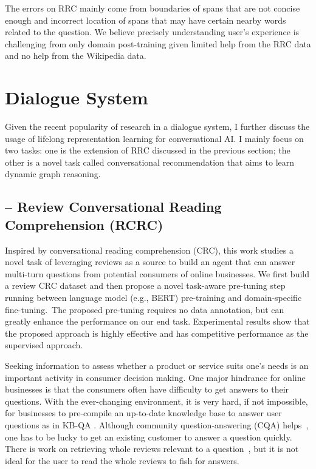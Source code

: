 The errors on RRC mainly come from boundaries of spans that are not concise enough and incorrect location of spans that may have certain nearby words related to the question. 
We believe precisely understanding user's experience is challenging from only domain post-training given limited help from the RRC data and no help from the Wikipedia data.

\section{Dialogue System}
\label{chap6:sec:dialogue}

Given the recent popularity of research in a dialogue system, I further discuss the usage of lifelong representation learning for conversational AI.
I mainly focus on two tasks: one is the extension of RRC discussed in the previous section; the other is a novel task called conversational recommendation that aims to learn dynamic graph reasoning.

\subsection{-- Review Conversational Reading Comprehension (RCRC)}

Inspired by conversational reading comprehension (CRC), this work studies a novel task of leveraging reviews as a source to build an agent that can answer multi-turn questions from potential consumers of online businesses. We first build a review CRC dataset and then propose a novel task-aware pre-tuning step running between language model (e.g., BERT) pre-training and domain-specific fine-tuning.~The proposed pre-tuning requires no data annotation, but can greatly enhance the performance on our end task. Experimental results show that the proposed approach is highly effective and has competitive performance as the supervised approach.

Seeking information to assess whether a product or service suits one's needs is an important activity in consumer decision making.
One major hindrance for online businesses is that the consumers often have difficulty to get answers to their questions.
With the ever-changing environment, it is very hard, if not impossible, for businesses to pre-compile an up-to-date knowledge base to answer user questions as in KB-QA \cite{kwok2001scaling,fader2014open,yin2015neural,xu2016question}.
Although community question-answering (CQA) helps~\cite{mcauley2016addressing}, one has to be lucky to get an existing customer to answer a question quickly. There is work on retrieving whole reviews relevant to a question~\cite{mcauley2016addressing,yu2018aware}, but it is not ideal for the user to read the whole reviews to fish for answers.

